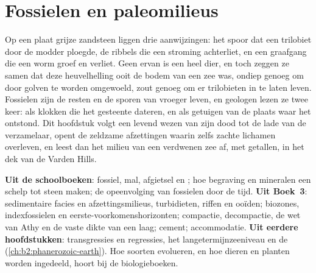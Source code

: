 \chapter{Fossielen en paleomilieus}\label{ch:b2:palaeoenvironments}

Op een plaat grijze zandsteen liggen drie aanwijzingen: het spoor dat een trilobiet door de modder ploegde,
de ribbels die een stroming achterliet, en een graafgang die een worm groef en verliet. Geen ervan is een
heel dier, en toch zeggen ze samen dat deze heuvelhelling ooit de bodem van een zee was, ondiep
genoeg om door golven te worden omgewoeld, zout genoeg om er trilobieten in te laten leven. Fossielen zijn de
resten en de sporen van vroeger leven, en geologen lezen ze twee keer: als klokken die het gesteente dateren,
en als getuigen van de plaats waar het ontstond. Dit hoofdstuk volgt een levend wezen van zijn dood
tot de lade van de verzamelaar, opent de zeldzame afzettingen waarin zelfs zachte lichamen overleven, en leest dan
het milieu van een verdwenen zee af, met getallen, in het dek van de Varden Hills.

\begin{recall}
\textbf{Uit de schoolboeken}: fossiel, mal, afgietsel en ; hoe begraving en mineralen
een schelp tot steen maken; de opeenvolging van fossielen door de tijd. \textbf{Uit Boek~3}:
sedimentaire facies en afzettingsmilieus, turbidieten, riffen en ooïden; biozones,
indexfossielen en eerste-voorkomenshorizonten; compactie, decompactie, de wet van Athy en de vaste dikte
van een laag; cement; accommodatie. \textbf{Uit eerdere hoofdstukken}: transgressies en regressies,
het langetermijnzeeniveau en de  (\cref{ch:b2:phanerozoic-earth}). Hoe
soorten evolueren, en hoe dieren en planten worden ingedeeld, hoort bij de biologieboeken.
\end{recall}


